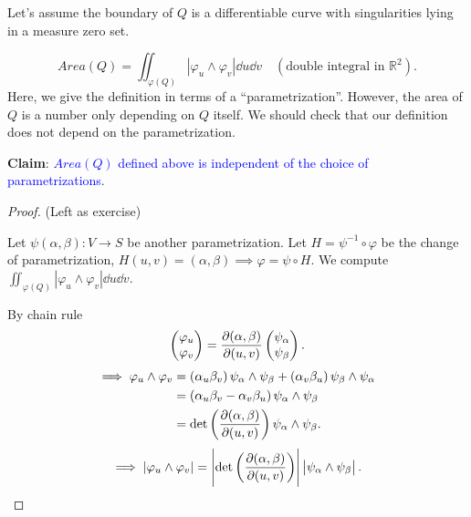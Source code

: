 \begin{enumerate}[(1)]
\begin{center}
\begin{tikzpicture}[x=0.75pt,y=0.75pt,yscale=-0.9,xscale=0.9]
\end{tikzpicture}
    \end{center}
    Let's assume the boundary of \(Q\) is a differentiable curve with 
    singularities lying in a measure zero set.
\begin{definition}[Area of \(Q\)]
    \[Area(Q)=\iint_{\varphi(Q)} \left|\varphi_u\wedge 
    \varphi_v \right|\dd u\dd v \quad(\text{double integral in }
    \mathbb{R}^2).\]
    Here, we give the definition in terms of a ``parametrization''. 
    However, the area of \(Q\) is a number only depending on \(Q\)
    itself. We should check that our definition does not depend on 
    the parametrization.
\end{definition}
\textbf{Claim}: 
\textcolor{blue}{\(Area(Q)\) defined above is independent of the
choice of parametrizations.}
\begin{proof} (Left as exercise)

    Let \(\psi(\alpha,\beta)\colon V\to S\) be another parametrization. 
    Let \(H=\psi^{-1}\circ \varphi\) be the change of parametrization,
    \(H(u,v)=(\alpha,\beta)\)\(\implies\varphi =\psi \circ H\).
    We compute \(\iint_{\varphi(Q)} \left|\varphi_u\wedge 
    \varphi_v \right|\dd u\dd v\).

    By chain rule 
    \[
        \begin{pmatrix}
            \varphi_u\\ \varphi_v
        \end{pmatrix}=
        \pdv{(\alpha,\beta)}{(u,v)}\begin{pmatrix}
            \psi_\alpha\\
            \psi_\beta
        \end{pmatrix}    .
    \]
    \begin{align*}
        \implies \varphi_u\wedge\varphi_v&=
        \left(\alpha_u\beta_v\right)\psi_\alpha\wedge\psi_\beta+
        \left(\alpha_v\beta_u\right)\psi_\beta\wedge\psi_\alpha\\
        &=\left(\alpha_u\beta_v-\alpha_v\beta_u\right)
        \psi_\alpha\wedge\psi_\beta\\
        &=\det\left(\pdv{(\alpha,\beta)}{(u,v)}\right)
        \psi_\alpha\wedge\psi_\beta.
    \end{align*}
    \[\implies \left|
        \varphi_u\wedge \varphi_v 
    \right|=\left|\det\left(\pdv{(\alpha,\beta)}{(u,v)}\right)\right|
    \left|\psi_\alpha\wedge\psi_\beta\right|.\]
    

\end{proof}
\end{enumerate}
